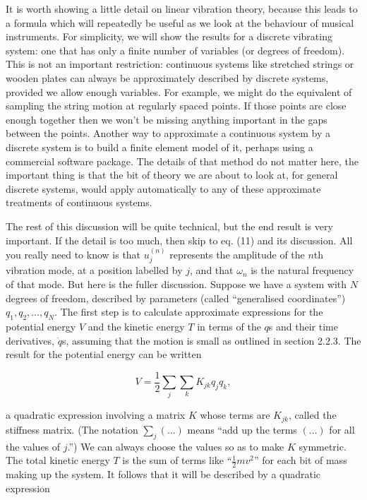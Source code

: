   It is worth showing a little detail on linear vibration theory, because this 
  leads to a formula which will repeatedly be useful as we look at the 
  behaviour of musical instruments. For simplicity, we will show the results 
  for a discrete vibrating system: one that has only a finite number of 
  variables (or degrees of freedom). This is not an important restriction: 
  continuous systems like stretched strings or wooden plates can always be 
  approximately described by discrete systems, provided we allow enough 
  variables. For example, we might do the equivalent of sampling the string 
  motion at regularly spaced points. If those points are close enough together 
  then we won't be missing anything important in the gaps between the points. 
  Another way to approximate a continuous system by a discrete system is to 
  build a finite element model of it, perhaps using a commercial software 
  package. The details of that method do not matter here, the important thing 
  is that the bit of theory we are about to look at, for general discrete 
  systems, would apply automatically to any of these approximate treatments of 
  continuous systems. 

  The rest of this discussion will be quite technical, but the end result is 
  very important. If the detail is too much, then skip to eq. (11) and its 
  discussion. All you really need to know is that $u_j^{(n)}$ represents the 
  amplitude of the $n$th vibration mode, at a position labelled by $j$, and 
  that $\omega_n$ is the natural frequency of that mode. But here is the fuller 
  discussion. Suppose we have a system with $N$ degrees of freedom, described 
  by parameters (called ``generalised coordinates'') $q_1,q_2,\dots,q_N$. The 
  first step is to calculate approximate expressions for the potential energy 
  $V$ and the kinetic energy $T$ in terms of the $q$s and their time 
  derivatives, $\dot{q}$s, assuming that the motion is small as outlined in 
  section 2.2.3. The result for the potential energy can be written 

  \begin{equation*}V=\dfrac{1}{2}\sum_j \sum_k K_{jk} q_j q_k, \tag{1} 
  \end{equation*} 

  \noindent{}a quadratic expression involving a matrix $K$ whose terms are 
  $K_{jk}$, called the stiffness matrix. (The notation $\sum_j(\dots)$ means 
  ``add up the terms $(\dots)$ for all the values of $j$.'') We can always 
  choose the values so as to make $K$ symmetric. The total kinetic energy $T$ 
  is the sum of terms like ``$\frac{1}{2}mv^2$'' for each bit of mass making up 
  the system. It follows that it will be described by a quadratic expression 

